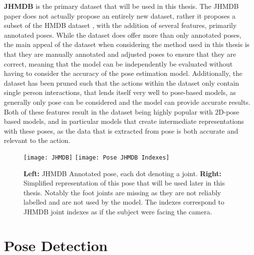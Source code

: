 \textbf{JHMDB} \cite{JHMDB} is the primary dataset that will be used in this thesis. The JHMDB paper does not actually propose an entirely new dataset, rather it proposes a subset of the HMDB dataset \cite{hmdb}, with the addition of several features, primarily annotated poses. While the dataset does offer more than only annotated poses, the main appeal of the dataset when considering the method used in this thesis is that they are manually  annotated and adjusted poses to ensure that they are correct, meaning that the model can be independently be evaluated without having to consider the accuracy of the pose estimation model. Additionally, the dataset has been pruned such that the actions within the dataset only contain single person interactions, that lends itself very well to pose-based models, as generally only pose can be considered and the model can provide accurate results. Both of these features result in the dataset being highly popular with 2D-pose based models, and in particular models that create intermediate representations with these poses, as the data that is extracted from pose is both accurate and relevant to the action.

\begin{figure}[ht]
	\texttt{[image: JHMDB]}
	\texttt{[image: Pose JHMDB Indexes]}
	\centering
	\caption{\textbf{Left:} JHMDB Annotated pose, each dot denoting a joint. \textbf{Right:} Simplified representation of this pose that will be used later in this thesis. Notably the foot joints are missing as they are not reliably labelled and are not used by the model. The indexes correspond to JHMDB joint indexes as if the subject were facing the camera.}
	\label{fig:JHMDB}
\end{figure}

\section{Pose Detection}
\label{sec:pose-detection}

